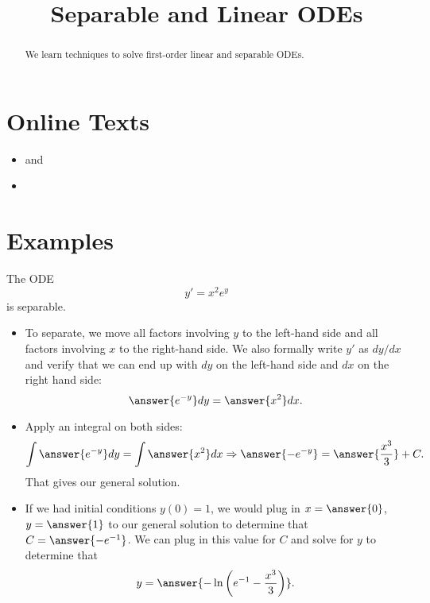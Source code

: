 \documentclass{ximera}
\title{Separable and Linear ODEs}
\begin{document}
\begin{abstract}
We learn techniques to solve first-order linear and separable ODEs.
\end{abstract}
\maketitle

\section*{Online Texts}
\begin{itemize}
\item {} and 
\item {}
\end{itemize}

\section*{Examples}

\begin{example}
The ODE
\[ y' =  x^2 e^y \]
is separable. 
\begin{itemize}
\item To separate, we move all factors involving $y$ to the left-hand side and all factors involving $x$ to the right-hand side. We also formally write $y'$ as $dy/dx$ and verify that we can end up with $dy$ on the left-hand side and $dx$ on the right hand side:
\[ \answer{e^{-y}} dy = \answer{x^2} dx. \]
\item Apply an integral on both sides:
\[ \int  \answer{e^{-y}} dy = \int \answer{x^2} dx \Rightarrow \answer{-e^{-y}} = \answer{\frac{x^3}{3}} + C.\]
That gives our general solution.
\item If we had initial conditions $y(0) = 1$, we would plug in $x=\answer{0}$, $y=\answer{1}$ to our general solution to determine that $C = \answer{-e^{-1}}$.  We can plug in this value for $C$ and solve for $y$ to determine that
\[ y = \answer{- \ln \left( e^{-1} - \frac{x^3}{3} \right)}. \]
\end{itemize}
\end{example}
\end{document}
